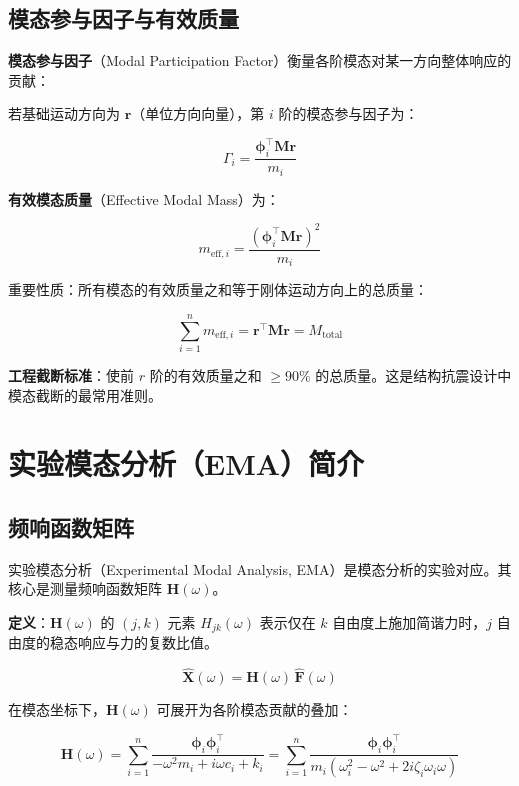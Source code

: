 \subsection{模态参与因子与有效质量}

\textbf{模态参与因子}（Modal Participation Factor）衡量各阶模态对某一方向整体响应的贡献：

若基础运动方向为 $\mathbf{r}$（单位方向向量），第 $i$ 阶的模态参与因子为：

\begin{myformula}
\[
\Gamma_i = \frac{\bm{\phi}_i^{\top} \mathbf{M} \mathbf{r}}{m_i}
\]
\end{myformula}

\textbf{有效模态质量}（Effective Modal Mass）为：

\begin{myformula}
\[
m_{\text{eff},i} = \frac{(\bm{\phi}_i^{\top}\mathbf{M}\mathbf{r})^2}{m_i}
\]
\end{myformula}

重要性质：所有模态的有效质量之和等于刚体运动方向上的总质量：

\[
\sum_{i=1}^{n} m_{\text{eff},i} = \mathbf{r}^{\top}\mathbf{M}\mathbf{r} = M_{\text{total}}
\]

\textbf{工程截断标准}：使前 $r$ 阶的有效质量之和 $\geq 90\%$ 的总质量。这是结构抗震设计中模态截断的最常用准则。

\section{实验模态分析（EMA）简介}

\subsection{频响函数矩阵}

实验模态分析（Experimental Modal Analysis, EMA）是模态分析的实验对应。其核心是测量频响函数矩阵 $\mathbf{H}(\omega)$。

\textbf{定义}：$\mathbf{H}(\omega)$ 的 $(j,k)$ 元素 $H_{jk}(\omega)$ 表示仅在 $k$ 自由度上施加简谐力时，$j$ 自由度的稳态响应与力的复数比值。

\[
\hat{\mathbf{X}}(\omega) = \mathbf{H}(\omega)\,\hat{\mathbf{F}}(\omega)
\]

在模态坐标下，$\mathbf{H}(\omega)$ 可展开为各阶模态贡献的叠加：

\begin{myformula}
\[
\mathbf{H}(\omega) = \sum_{i=1}^{n} \frac{\bm{\phi}_i \bm{\phi}_i^{\top}}{-\omega^2 m_i + i\omega c_i + k_i} = \sum_{i=1}^{n} \frac{\bm{\phi}_i \bm{\phi}_i^{\top}}{m_i(\omega_i^2 - \omega^2 + 2i\zeta_i\omega_i\omega)}
\]
\end{myformula}

